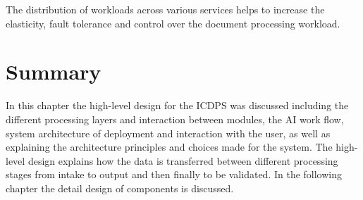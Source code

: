 The distribution of workloads across various services helps to increase the elasticity, fault tolerance and control over the document processing workload.

\section*{Summary}

In this chapter the high-level design for the ICDPS was discussed including the different processing layers and interaction between modules, the AI work flow, system architecture of deployment and interaction with the user, as well as explaining the architecture principles and choices made for the system. The high-level design explains how the data is transferred between different processing stages from intake to output and then finally to be validated. In the following chapter the detail design of components is discussed.
